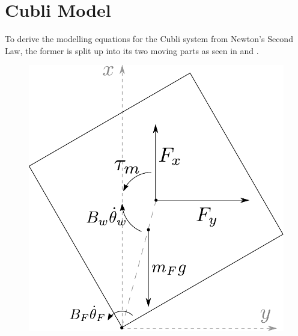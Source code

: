 \section{Cubli Model}
To derive the modelling equations for the Cubli system from Newton's Second Law, the former is split up into its two moving parts as seen in  and .

  \begin{minipage}{\linewidth}
  	\begin{minipage}{0.45\linewidth}
  		\begin{figure}[H]
  			\includegraphics[scale=.5]{figures/freeBodyFrame}
  			\centering
  			\captionsetup{justification=centering}
  			\label{freeBodyFrame}
  		\end{figure}\vspace{-5mm}
  	\end{minipage}
  	\hspace{0.03\linewidth}
  	\begin{minipage}{0.45\linewidth}
  		\begin{figure}[H]

\end{figure}
\end{minipage}
\end{minipage}
